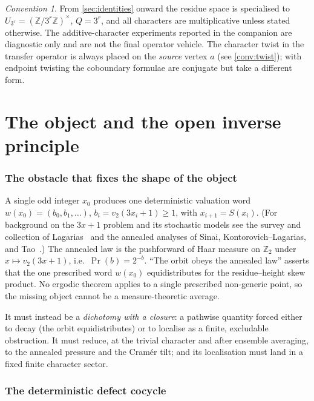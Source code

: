 \documentclass[11pt]{article}
\newcommand{\Z}{\mathbb{Z}}
\newcommand{\UQ}{U_{3^r}}
\theoremstyle{plain}
\theoremstyle{definition}
\theoremstyle{remark}
\newtheorem*{convention}{Convention}
\begin{document}
\tableofcontents

\begin{convention}
From \cref{sec:identities} onward the residue space is specialised to
$\UQ=(\Z/3^r\Z)^\times$, $Q=3^r$, and all characters are multiplicative unless
stated otherwise. The additive-character experiments reported in the companion
are diagnostic only and are not the final operator vehicle. The character twist
in the transfer operator is always placed on the \emph{source} vertex $a$ (see
\cref{conv:twist}); with endpoint twisting the coboundary formulae are conjugate
but take a different form.
\end{convention}

\part{The object and the open inverse principle}

\section{The obstacle that fixes the shape of the object}

A single odd integer $x_0$ produces one deterministic valuation word
$w(x_0)=(b_0,b_1,\dots)$, $b_i=v_2(3x_i+1)\ge1$, with $x_{i+1}=S(x_i)$. (For
background on the $3x+1$ problem and its stochastic models see the survey and
collection of Lagarias~\cite{lagarias1985,lagarias2010} and the annealed
analyses of Sinai, Kontorovich--Lagarias, and
Tao~\cite{sinai2003,kontorovichlagarias,tao2022}.) The
annealed law is the pushforward of Haar measure on $\Z_2$ under
$x\mapsto v_2(3x+1)$, i.e.\ $\Pr(b)=2^{-b}$. ``The orbit obeys the annealed law''
asserts that the one prescribed word $w(x_0)$ equidistributes for the
residue--height skew product. No ergodic theorem applies to a single prescribed
non-generic point, so the missing object cannot be a measure-theoretic average.

It must instead be a \emph{dichotomy with a closure}: a pathwise quantity forced
either to decay (the orbit equidistributes) or to localise as a finite,
excludable obstruction. It must reduce, at the trivial character and after
ensemble averaging, to the annealed pressure and the Cram\'er tilt; and its
localisation must land in a fixed finite character sector.

\section{The deterministic defect cocycle}
\label{sec:cocycle}
\end{document}
